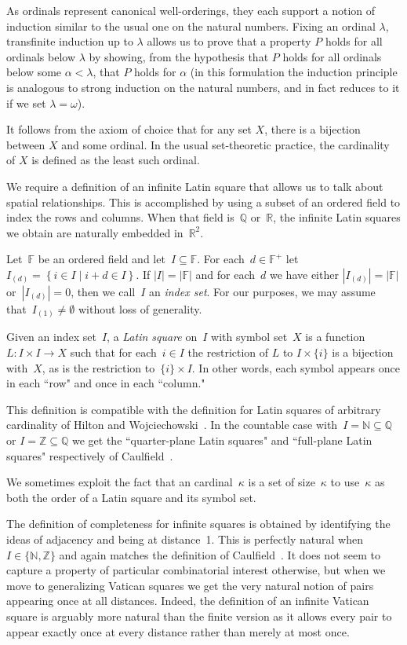 \documentclass[12pt,a4paper]{article}
\newcommand{\Z}{\mathbb{Z}}
\newcommand{\N}{\mathbb{N}}
\newcommand{\R}{\mathbb{R}}
\newcommand{\Q}{\mathbb{Q}}
\newcommand{\F}{\mathbb{F}}
\newcommand{\st}{\; | \;}
\newcommand{\set}[2]{\left\{#1\st #2 \right\}}
\begin{document}
As ordinals represent canonical well-orderings, they each support a notion of induction similar to the usual one on the natural numbers. Fixing an ordinal $\lambda$, transfinite induction up to $\lambda$ allows us to prove that a property $P$ holds for all ordinals below $\lambda$ by showing, from the hypothesis that $P$ holds for all ordinals below some $\alpha<\lambda$, that $P$ holds for $\alpha$ (in this formulation
the induction principle is analogous to strong induction on the natural numbers, and in fact reduces to it if we set $\lambda=\omega$).

It follows from the axiom of choice that for any set $X$, there is a bijection between $X$ and some ordinal. In the usual set-theoretic practice, the cardinality of $X$ is defined as the least such ordinal. 

We require a definition of an infinite Latin square that allows us to talk about spatial relationships.  This is accomplished by using a subset of an ordered field to index the rows and columns.  When that field is~$\Q$ or~$\R$, the infinite Latin squares we obtain are naturally embedded in~$\R^2$.

Let~$\F$ be an ordered field and let~$I \subseteq \F$.   For each~$d \in \F^+$ let~$I_{(d)} = \set{ i \in I }{  i+d \in I }$.  If $|I| = |\F|$ and for each~$d$ we have either $|I_{(d)}| = |\F|$ or~$|I_{(d)}| = 0$, then we call~$I$ an {\em index set}.   For our purposes, we may assume that~$I_{(1)} \neq \emptyset$ without loss of generality.

Given an index set~$I$, a {\em Latin square} on~$I$ with symbol set~$X$ is a function $L: I \times I \rightarrow X$ such that for each~$i \in I$ the restriction of $L$ to $I \times \{i\}$ is a bijection with~$X$, as is the restriction to~$\{i\} \times I$.   In other words, each symbol appears once in each ``row" and once in each ``column."  

This definition is  compatible with the definition for Latin squares of arbitrary cardinality of Hilton and Wojciechowski~\cite{HW05}.  In the countable case with~$I = \N \subseteq \Q$ or $I = \Z \subseteq \Q$ we get the ``quarter-plane Latin squares" and ``full-plane Latin squares" respectively of Caulfield~\cite{Caulfield96}.

We sometimes exploit the fact that an cardinal~$\kappa$ is a set of size~$\kappa$ to use~$\kappa$ as both the order of a Latin square and its symbol set.

The definition of completeness for infinite squares is obtained by identifying the ideas of adjacency and being at distance~1.  This is perfectly natural when~$I \in \{ \N ,\Z\}$ and again matches the definition of Caulfield~\cite{Caulfield96}.   It does not seem to capture a property of particular combinatorial interest otherwise, but when we move to generalizing Vatican squares we get the very natural notion of pairs appearing once at all distances.  Indeed, the definition of an infinite Vatican square is arguably more natural than the finite version as it allows every pair to appear exactly once at every distance rather than merely at most once.
\end{document}
